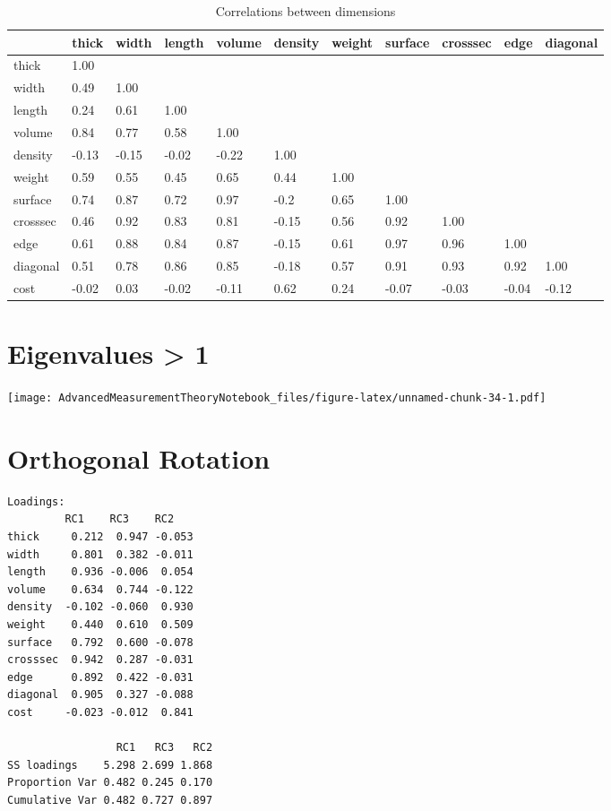 \documentclass[
]{book}
\begin{document}
\tiny
\begin{table}

\caption{\label{tab:unnamed-chunk-33}Correlations between dimensions}
\centering
\begin{tabular}[t]{l|l|l|l|l|l|l|l|l|l|l}
\hline
  & thick & width & length & volume & density & weight & surface & crosssec & edge & diagonal\\
\hline
thick & 1.00 &  &  &  &  &  &  &  &  & \\
\hline
width & 0.49 & 1.00 &  &  &  &  &  &  &  & \\
\hline
length & 0.24 & 0.61 & 1.00 &  &  &  &  &  &  & \\
\hline
volume & 0.84 & 0.77 & 0.58 & 1.00 &  &  &  &  &  & \\
\hline
density & -0.13 & -0.15 & -0.02 & -0.22 & 1.00 &  &  &  &  & \\
\hline
weight & 0.59 & 0.55 & 0.45 & 0.65 & 0.44 & 1.00 &  &  &  & \\
\hline
surface & 0.74 & 0.87 & 0.72 & 0.97 & -0.2 & 0.65 & 1.00 &  &  & \\
\hline
crosssec & 0.46 & 0.92 & 0.83 & 0.81 & -0.15 & 0.56 & 0.92 & 1.00 &  & \\
\hline
edge & 0.61 & 0.88 & 0.84 & 0.87 & -0.15 & 0.61 & 0.97 & 0.96 & 1.00 & \\
\hline
diagonal & 0.51 & 0.78 & 0.86 & 0.85 & -0.18 & 0.57 & 0.91 & 0.93 & 0.92 & 1.00\\
\hline
cost & -0.02 & 0.03 & -0.02 & -0.11 & 0.62 & 0.24 & -0.07 & -0.03 & -0.04 & -0.12\\
\hline
\end{tabular}
\end{table}

\hypertarget{eigenvalues-1}{%
\section{Eigenvalues \textgreater{} 1}\label{eigenvalues-1}}

\texttt{[image: AdvancedMeasurementTheoryNotebook\_files/figure-latex/unnamed-chunk-34-1.pdf]}

\hypertarget{orthogonal-rotation-1}{%
\section{Orthogonal Rotation}\label{orthogonal-rotation-1}}

\footnotesize

\begin{verbatim}
Loadings:
         RC1    RC3    RC2   
thick     0.212  0.947 -0.053
width     0.801  0.382 -0.011
length    0.936 -0.006  0.054
volume    0.634  0.744 -0.122
density  -0.102 -0.060  0.930
weight    0.440  0.610  0.509
surface   0.792  0.600 -0.078
crosssec  0.942  0.287 -0.031
edge      0.892  0.422 -0.031
diagonal  0.905  0.327 -0.088
cost     -0.023 -0.012  0.841

                 RC1   RC3   RC2
SS loadings    5.298 2.699 1.868
Proportion Var 0.482 0.245 0.170
Cumulative Var 0.482 0.727 0.897
\end{verbatim}
\end{document}
